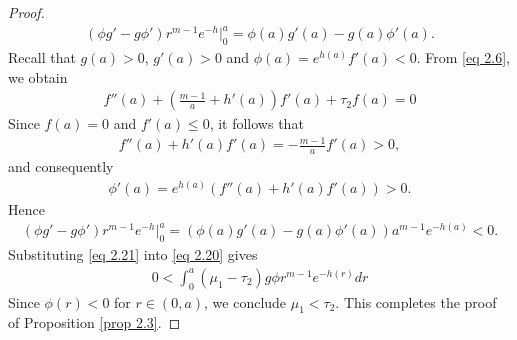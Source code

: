 \documentclass[11pt,leqno]{amsart}
\numberwithin{equation}{section}
\begin{document}
\begin{proof}
\begin{align*}
    (\phi g'-g\phi')r^{m-1}e^{-h}\Big|_{0}^{a}=\phi(a)g'(a)-g(a)\phi'(a).
\end{align*}
Recall that  $g(a)>0$, $g' (a)>0$ and $\phi(a)=e^{h(a)}f'(a)<0$. From \eqref{eq 2.6}, we obtain  
\begin{align*}
    f''(a)+(\frac{m-1}{a}+h'(a))f'(a)+\tau_{2}f(a)=0
\end{align*}
Since $f(a)=0$ and $f'(a)\leq 0$, it follows that
\begin{align*}
    f''(a)+h'(a)f'(a)=-\frac{m-1}{a}f'(a)> 0,
\end{align*}
and consequently
\begin{align*}
    \phi'(a)=e^{h(a)}(f''(a)+h'(a)f'(a))> 0.
\end{align*}
Hence
\begin{align}\label{eq 2.21}
    (\phi g'-g\phi')r^{m-1}e^{-h}\Big|_{0}^{a}= (\phi(a) g'(a)-g(a)\phi'(a))a^{m-1}e^{-h(a)}< 0.
\end{align}
Substituting  \eqref{eq 2.21} into  \eqref{eq 2.20} gives
\begin{align*}
    0< \int_{0}^{a}(\mu_{1}-\tau_{2})g\phi r^{m-1}e^{-h(r)}dr
\end{align*}
Since $\phi(r)<0$ for $r\in (0,a)$, we conclude $ \mu_{1}< \tau_{2}$. This completes  the proof of  Proposition  \ref{prop 2.3}.
\end{proof}
\end{document}

